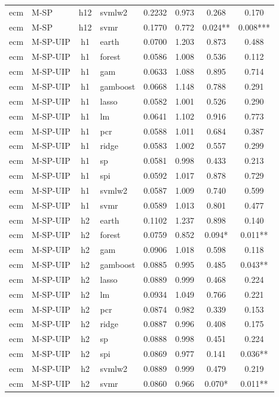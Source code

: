 \begin{ThreePartTable}
\begin{longtable}[t]{llclcccc}
ecm & M-SP & h12 & svmlw2 & 0.2232 & 0.973 & 0.268 & 0.170\\
ecm & M-SP & h12 & svmr & 0.1770 & 0.772 & 0.024** & 0.008***\\
\addlinespace
ecm & M-SP-UIP & h1 & earth & 0.0700 & 1.203 & 0.873 & 0.488\\
ecm & M-SP-UIP & h1 & forest & 0.0586 & 1.008 & 0.536 & 0.112\\
ecm & M-SP-UIP & h1 & gam & 0.0633 & 1.088 & 0.895 & 0.714\\
ecm & M-SP-UIP & h1 & gamboost & 0.0668 & 1.148 & 0.788 & 0.291\\
ecm & M-SP-UIP & h1 & lasso & 0.0582 & 1.001 & 0.526 & 0.290\\
ecm & M-SP-UIP & h1 & lm & 0.0641 & 1.102 & 0.916 & 0.773\\
ecm & M-SP-UIP & h1 & pcr & 0.0588 & 1.011 & 0.684 & 0.387\\
ecm & M-SP-UIP & h1 & ridge & 0.0583 & 1.002 & 0.557 & 0.299\\
ecm & M-SP-UIP & h1 & sp & 0.0581 & 0.998 & 0.433 & 0.213\\
ecm & M-SP-UIP & h1 & spi & 0.0592 & 1.017 & 0.878 & 0.729\\
ecm & M-SP-UIP & h1 & svmlw2 & 0.0587 & 1.009 & 0.740 & 0.599\\
ecm & M-SP-UIP & h1 & svmr & 0.0589 & 1.013 & 0.801 & 0.477\\
\addlinespace
ecm & M-SP-UIP & h2 & earth & 0.1102 & 1.237 & 0.898 & 0.140\\
ecm & M-SP-UIP & h2 & forest & 0.0759 & 0.852 & 0.094* & 0.011**\\
ecm & M-SP-UIP & h2 & gam & 0.0906 & 1.018 & 0.598 & 0.118\\
ecm & M-SP-UIP & h2 & gamboost & 0.0885 & 0.995 & 0.485 & 0.043**\\
ecm & M-SP-UIP & h2 & lasso & 0.0889 & 0.999 & 0.468 & 0.224\\
ecm & M-SP-UIP & h2 & lm & 0.0934 & 1.049 & 0.766 & 0.221\\
ecm & M-SP-UIP & h2 & pcr & 0.0874 & 0.982 & 0.339 & 0.153\\
ecm & M-SP-UIP & h2 & ridge & 0.0887 & 0.996 & 0.408 & 0.175\\
ecm & M-SP-UIP & h2 & sp & 0.0888 & 0.998 & 0.451 & 0.224\\
ecm & M-SP-UIP & h2 & spi & 0.0869 & 0.977 & 0.141 & 0.036**\\
ecm & M-SP-UIP & h2 & svmlw2 & 0.0889 & 0.999 & 0.479 & 0.219\\
ecm & M-SP-UIP & h2 & svmr & 0.0860 & 0.966 & 0.070* & 0.011**\\

\end{longtable}
\end{ThreePartTable}
